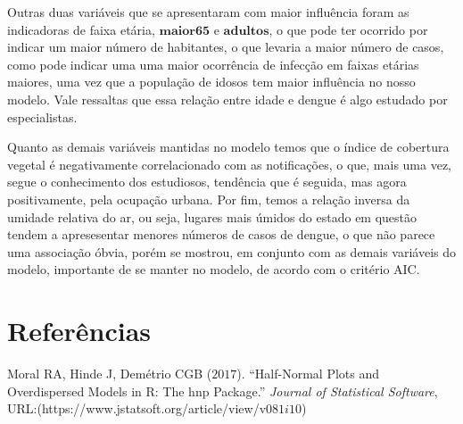 \documentclass[12pt,a4paper]{article}\usepackage[]{graphicx}\usepackage[]{color}
\begin{document}
Outras duas variáveis que se apresentaram com maior influência foram as indicadoras de faixa etária, $\mathbf{maior65}$ e $\mathbf{adultos}$, o que pode ter ocorrido por indicar um maior número de habitantes, o que levaria a maior número de casos, como pode indicar uma uma maior ocorrência de infecção em faixas etárias maiores, uma vez que a população de idosos tem maior influência no nosso modelo. Vale ressaltas que essa relação entre idade e dengue é algo estudado por especialistas.


Quanto as demais variáveis mantidas no modelo temos que o índice de cobertura vegetal é negativamente correlacionado com as notificações, o que, mais uma vez, segue o conhecimento dos estudiosos, tendência que é seguida, mas agora positivamente, pela ocupação urbana. Por fim, temos a relação inversa da umidade relativa do ar, ou seja, lugares mais úmidos do estado em questão tendem a apresesentar menores números de casos de dengue, o que não parece uma associação óbvia, porém se mostrou, em conjunto com as demais variáveis do modelo, importante de se manter no modelo, de acordo com o critério AIC.

\section{{\LARGE\textbf{Referências}}}

Moral RA, Hinde J, Demétrio CGB ($2017$). “Half-Normal Plots and Overdispersed Models in R: The hnp Package.” \emph{Journal of Statistical Software}, URL:(https://www.jstatsoft.org/article/view/v$081i10$)
\end{document}
